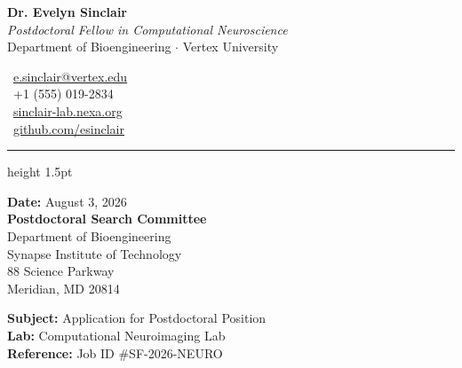 \documentclass[11pt,letterpaper]{article}
\begin{document}
\pagestyle{empty}


\begin{minipage}[t]{0.6\textwidth}
    {\fontsize{24}{28}\selectfont \bfseries \color{primary} Dr. Evelyn Sinclair} \\[0.2em]
    {\fontsize{11}{14}\selectfont \itshape Postdoctoral Fellow in Computational Neuroscience} \\
    {\fontsize{9}{12}\selectfont \color{darkgray} Department of Bioengineering $\cdot$ Vertex University}
\end{minipage}%
\begin{minipage}[t]{0.4\textwidth}
    \raggedleft
    {\fontsize{9}{12}\selectfont \color{darkgray}
    \faEnvelope \ \href{mailto:e.sinclair@vertex.edu}{e.sinclair@vertex.edu} \\
    \faPhone \ +1 (555) 019-2834 \\
    \faGlobe \ \href{https://sinclair-lab.nexa.org}{sinclair-lab.nexa.org} \\
    \faGithub \ \href{https://github.com/esinclair}{github.com/esinclair}
    }
\end{minipage}

\vspace{0.4em}
{\color{secondary}\hrule height 1.5pt}
\vspace{1.0em}

\begin{minipage}[t]{0.55\textwidth}
    {\fontsize{10}{13}\selectfont
    {\bfseries Date:} August 3, 2026 \\[0.6em]
    {\bfseries Postdoctoral Search Committee} \\
    Department of Bioengineering \\
    Synapse Institute of Technology \\
    88 Science Parkway \\
    Meridian, MD 20814
    }
\end{minipage}%
\begin{minipage}[t]{0.45\textwidth}
    \raggedleft
    {\fontsize{10}{13}\selectfont
    {\bfseries Subject:} Application for Postdoctoral Position \\
    {\bfseries Lab:} Computational Neuroimaging Lab \\
    {\bfseries Reference:} Job ID \#SF-2026-NEURO
    }
\end{minipage}
\end{document}
